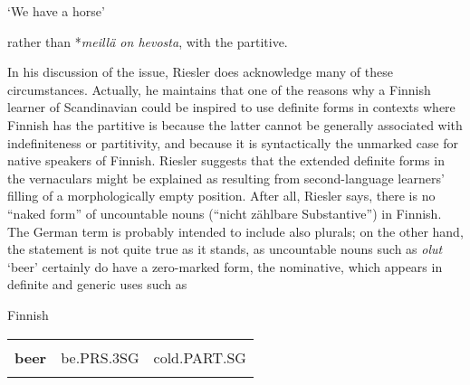 \begin{styleTranslation}
‘We have a horse’

\end{styleTranslation}

\begin{styleBodyTextFirst}
rather than *\textit{meillä on hevosta}, with the partitive.

\end{styleBodyTextFirst}

\begin{styleBodytextC}
In his discussion of the issue, Riesler does acknowledge many of these circumstances. Actually, he maintains that one of the reasons why a Finnish learner of Scandinavian could be inspired to use definite forms in contexts where Finnish has the partitive is because the latter cannot be generally associated with indefiniteness or partitivity, and because it is syntactically the unmarked case for native speakers of Finnish. Riesler suggests that the extended definite forms in the vernaculars might be explained as resulting from second-language learners’ filling of a morphologically empty position. After all, Riesler says, there is no “naked form” of uncountable nouns (“nicht zählbare Substantive”) in Finnish. The German term is probably intended to include also plurals; on the other hand, the statement is not quite true as it stands, as uncountable nouns such as \textit{olut} ‘beer’ certainly do have a zero-marked form, the nominative, which appears in definite and generic uses such as

\end{styleBodytextC}

\begin{listWWNumileveli}
\item 

\begin{styleExample}
Finnish

\end{styleExample}

\end{listWWNumileveli}

\begin{listWWNumlivleveli}
\item 

\end{listWWNumlivleveli}

\begin{tabular}{lll}
\lsptoprule
\multicolumn{3}{l}{Olut

}\\
{\bfseries beer} & be.PRS.3SG & cold.PART.SG\\
\lspbottomrule
\end{tabular}

